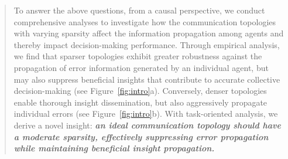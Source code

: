 \documentclass[11pt]{article}
\begin{document}
\begin{abstract}

To answer the above questions, from a causal perspective, we conduct comprehensive analyses to investigate how the communication topologies with varying sparsity affect the information propagation among agents and thereby impact decision-making performance. 
Through empirical analysis, we find that sparser topologies exhibit greater robustness against the propagation of error information generated by an individual agent, but may also suppress beneficial insights that contribute to accurate collective decision-making (see Figure~\ref{fig:intro}a). Conversely, denser topologies enable thorough insight dissemination, but also aggressively propagate individual errors (see Figure~\ref{fig:intro}b). With task-oriented analysis, we derive a novel insight: \textbf{\textit{an ideal communication topology should have a moderate sparsity, effectively suppressing error propagation while maintaining beneficial insight propagation.}}



\end{abstract}
\end{document}
